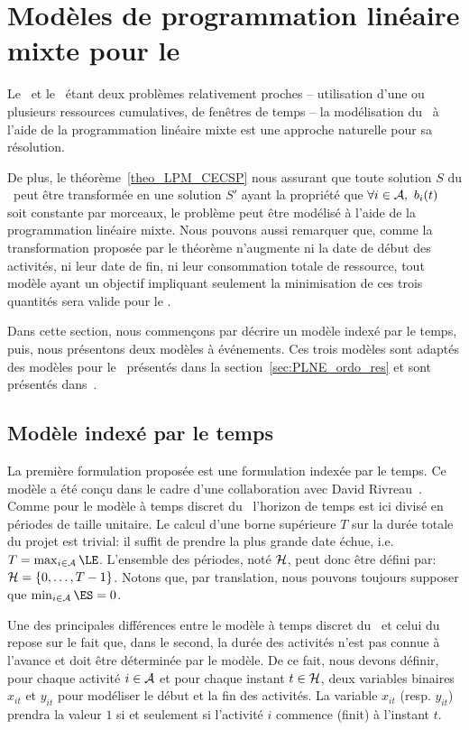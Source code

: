 \section{Modèles de programmation linéaire mixte pour le
\CECSP}
\label{sec:modele_CECSP}
Le \CECSP ~et le \RCPSP~étant deux problèmes relativement proches --
utilisation d'une ou plusieurs ressources cumulatives, de fenêtres de
temps -- la modélisation du \CECSP~à l'aide de la programmation
linéaire mixte est une approche naturelle pour
sa résolution. 

De plus, le théorème~\ref{theo_LPM_CECSP} nous assurant que toute solution
$S$ du \CECSP~peut être transformée en une solution $S'$ ayant la
propriété que $\forall i \in \A,\ b_i(t)$ soit constante par morceaux,
le problème peut être modélisé à l'aide de la programmation linéaire
mixte. Nous pouvons aussi remarquer que, comme la transformation
proposée par le théorème n'augmente ni la date de début des activités,
ni leur date de fin, ni leur consommation totale de ressource, tout modèle
ayant un objectif impliquant seulement la minimisation de ces trois
quantités sera valide pour le \CECSP.

Dans cette section, nous commençons par décrire un modèle indexé par
le temps, puis, nous présentons deux modèles à événements. Ces trois
modèles sont adaptés des modèles pour le \RCPSP~présentés dans la
section~\ref{sec:PLNE_ordo_res} et sont présentés
dans~\cite{Nattaf_ORSpectrum}.   


\subsection{Modèle indexé par le temps}

La première formulation proposée est une formulation indexée par le
temps. Ce modèle a été conçu dans le cadre d'une collaboration avec
David Rivreau~\cite{Nattaf_ORSpectrum}. Comme pour le modèle à temps discret du \RCPSP~l'horizon de
temps est ici divisé en périodes de taille unitaire. Le calcul d'une
borne supérieure $T$ sur la durée totale du projet est trivial: il
suffit de prendre la plus grande date échue, i.e. $T=\max_{i \in \A}
\LE$. L'ensemble des périodes, noté ${\cal H}$, peut donc être défini par:
${\cal H}=\{0,\dots,T-1\}$.  Notons que, par translation, nous pouvons
toujours supposer que $\min_{i\in \A} \ES=0$.

Une des principales différences entre le modèle à temps discret du
\RCPSP~et celui du \CECSP~ repose sur le fait que, dans le
second, la durée des activités n'est pas connue à l'avance et doit
être déterminée par le modèle. De ce fait, nous devons définir,
pour chaque activité $i \in {\cal A}$ et pour chaque instant $t
\in {\cal H}$, deux variables binaires $x_{it}$ et $y_{it}$ pour
modéliser le début et la fin des activités. La variable $x_{it}$
(resp. $y_{it}$) prendra la valeur $1$ si et seulement si
l'activité $i$ commence (finit) à l'instant $t$.

